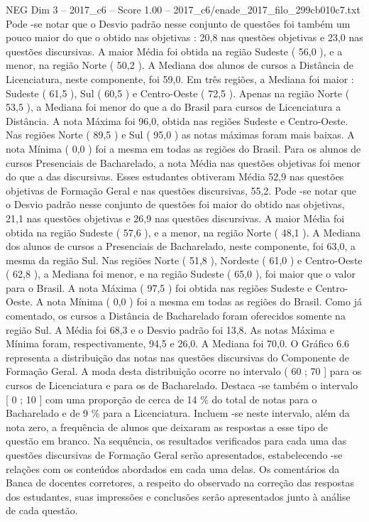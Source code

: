 \begin{textsample}{NEG Dim 3 – 2017\_c6 – Score 1.00 – 2017\_c6/enade\_2017\_filo\_299cb010c7.txt}
Pode -se notar que o Desvio padrão nesse conjunto de questões foi também um pouco maior do que o obtido nas objetivas : 20,8 nas questões objetivas e 23,0 nas questões discursivas.
A maior Média foi obtida na região Sudeste ( 56,0 ), e a menor, na região Norte ( 50,2 ).
A Mediana dos alunos de cursos a Distância de Licenciatura, neste componente, foi 59,0.
Em três regiões, a Mediana foi maior : Sudeste ( 61,5 ), Sul ( 60,5 ) e Centro-Oeste ( 72,5 ).
Apenas na região Norte ( 53,5 ), a Mediana foi menor do que a do Brasil para cursos de Licenciatura a Distância.
A nota Máxima foi 96,0, obtida nas regiões Sudeste e Centro-Oeste.
Nas regiões Norte ( 89,5 ) e Sul ( 95,0 ) as notas máximas foram mais baixas.
A nota Mínima ( 0,0 ) foi a mesma em todas as regiões do Brasil.
Para os alunos de cursos Presenciais de Bacharelado, a nota Média nas questões objetivas foi menor do que a das discursivas.
Esses estudantes obtiveram Média 52,9 nas questões objetivas de Formação Geral e nas questões discursivas, 55,2.
Pode -se notar que o Desvio padrão nesse conjunto de questões foi maior do obtido nas objetivas, 21,1 nas questões objetivas e 26,9 nas questões discursivas.
A maior Média foi obtida na região Sudeste ( 57,6 ), e a menor, na região Norte ( 48,1 ).
A Mediana dos alunos de cursos a Presenciais de Bacharelado, neste componente, foi 63,0, a mesma da região Sul.
Nas regiões Norte ( 51,8 ), Nordeste ( 61,0 ) e Centro-Oeste ( 62,8 ), a Mediana foi menor, e na região Sudeste ( 65,0 ), foi maior que o valor para o Brasil.
A nota Máxima ( 97,5 ) foi obtida nas regiões Sudeste e Centro-Oeste.
A nota Mínima ( 0,0 ) foi a mesma em todas as regiões do Brasil.
Como já comentado, os cursos a Distância de Bacharelado foram oferecidos somente na região Sul.
A Média foi 68,3 e o Desvio padrão foi 13,8.
As notas Máxima e Mínima foram, respectivamente, 94,5 e 26,0.
A Mediana foi 70,0.
O Gráfico 6.6 representa a distribuição das notas nas questões discursivas do Componente de Formação Geral.
A moda desta distribuição ocorre no intervalo ( 60 ; 70 ] para os cursos de Licenciatura e para os de Bacharelado.
Destaca -se também o intervalo [ 0 ; 10 ] com uma proporção de cerca de 14 \% do total de notas para o Bacharelado e de 9 \% para a Licenciatura.
Incluem -se neste intervalo, além da nota zero, a frequência de alunos que deixaram as respostas a esse tipo de questão em branco.
Na sequência, os resultados verificados para cada uma das questões discursivas de Formação Geral serão apresentados, estabelecendo -se relações com os conteúdos abordados em cada uma delas.
Os comentários da Banca de docentes corretores, a respeito do observado na correção das respostas dos estudantes, suas impressões e conclusões serão apresentados junto à análise de cada questão.

\end{textsample}

